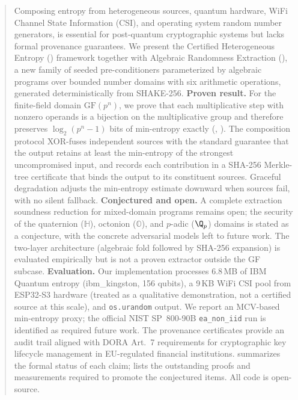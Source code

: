 \begin{abstract}
Composing entropy from heterogeneous sources, quantum hardware,
WiFi Channel State Information (CSI), and operating system random
number generators, is essential for post-quantum cryptographic
systems but lacks formal provenance guarantees.
%
We present the Certified Heterogeneous Entropy (\che) framework
together with Algebraic Randomness Extraction (\are), a new family
of seeded pre-conditioners parameterized by algebraic programs over
bounded number domains with six arithmetic operations, generated
deterministically from SHAKE-256.
%
\textbf{Proven result.}
For the finite-field domain $\mathrm{GF}(p^n)$, we prove that each
multiplicative step with nonzero operands is a bijection on the
multiplicative group and therefore preserves $\log_2(p^n - 1)$ bits
of min-entropy exactly (, ).
%
The composition protocol XOR-fuses independent sources with the
standard guarantee that the output retains at least the
min-entropy of the strongest uncompromised input, and records each
contribution in a SHA-256 Merkle-tree certificate that binds the
output to its constituent sources.
%
Graceful degradation adjusts the min-entropy estimate downward
when sources fail, with no silent fallback.
%
\textbf{Conjectured and open.}
A complete extraction soundness reduction for mixed-domain \are
programs remains open; the security of the quaternion
($\mathbb{H}$), octonion ($\mathbb{O}$), and $p$-adic ($\Q_p$)
domains is stated as a conjecture, with the concrete adversarial
models left to future work.
%
The two-layer architecture (algebraic fold followed by SHA-256
expansion) is evaluated empirically but is not a proven extractor
outside the GF subcase.
%
\textbf{Evaluation.}
Our implementation processes 6.8\,MB of IBM Quantum entropy
(ibm\_kingston, 156 qubits), a 9\,KB WiFi CSI pool from ESP32-S3
hardware (treated as a qualitative demonstration, not a certified
source at this scale), and \texttt{os.urandom} output.
%
We report an MCV-based min-entropy proxy; the official NIST
SP~800-90B \texttt{ea\_non\_iid} run is identified as required
future work.
%
The provenance certificates provide an audit trail aligned with
DORA Art.~7 requirements for cryptographic key lifecycle
management in EU-regulated financial institutions.
%
 summarizes the formal status of
each claim;  lists the outstanding proofs
and measurements required to promote the conjectured items.
%
All code is open-source.
\end{abstract}

